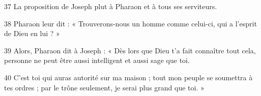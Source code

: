37 La proposition de Joseph plut à Pharaon et à tous ses serviteurs.

38 Pharaon leur dit : « Trouverons-nous un homme comme celui-ci, qui a l’esprit de Dieu en lui ? »

39 Alors, Pharaon dit à Joseph : « Dès lors que Dieu t’a fait connaître tout cela, personne ne peut être aussi intelligent et aussi sage que toi.

40 C’est toi qui auras autorité sur ma maison ; tout mon peuple se soumettra à tes ordres ; par le trône seulement, je serai plus grand que toi. »
